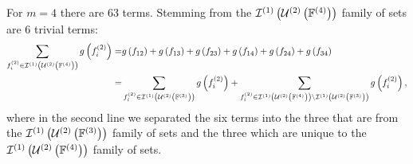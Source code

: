 \documentclass[11pt]{article}
\newcommand{\gxn}[1]{g\left(#1\right)}
\newcommand{\fn}[1]{f^{(#1)}}
\newcommand{\ints}[2]{\mathcal{I}^{(#1)}\left(#2\right)}
\newcommand{\fmem}[2]{f^{\left(#1\right)}_{#2}}
\begin{document}
\newcommand{\intsset}[3]{\ints{#1}{\unionset{#2}{#3}}}

For $m=4$ there are 63 terms. Stemming from the $\intsset{1}{2}{4}$ family of
sets are 6 trivial terms:
\begin{align}
	\sum_{\fmem{2}{i}\in\intsset{1}{2}{4}}\gxn{\fmem{2}{i}} =&
	  \gxn{\Di} + \gxn{\Dj} + \gxn{\Dk} + \gxn{\Dl} +
	  \gxn{\Dm} + \gxn{\Dn}\nonumber\\
	=& \sum_{\fmem{2}{i}\in\intsset{1}{2}{3}}\gxn{\fmem{2}{i}} +
	   \sum_{\fmem{2}{i}\in\intsset{1}{2}{4}\setminus\intsset{1}{2}{3}}
	    \gxn{\fn{2}_i},
\end{align}
where in the second line we separated the six terms into the three that are
from the $\intsset{1}{2}{3}$ family of sets and the three which are unique to
the $\intsset{1}{2}{4}$ family of sets.
\end{document}
